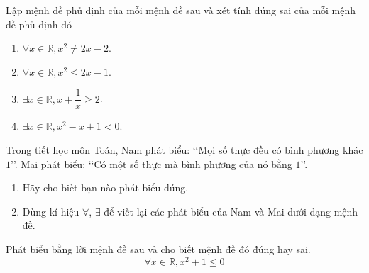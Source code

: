 \begin{bt}%
	Lập mệnh đề phủ định của mỗi mệnh đề sau và xét tính đúng sai của mỗi mệnh đề phủ định đó
	\begin{enumerate}
		\item $\forall x \in \mathbb{R}, x^2 \neq 2x-2$.
		\item $\forall x \in \mathbb{R}, x^2 \leq 2x-1$.
		\item $\exists x \in \mathbb{R}, x+\dfrac{1}{x} \geq 2$.
		\item $\exists x \in \mathbb{R}, x^2-x+1<0$.
	\end{enumerate}
\end{bt}
\begin{bt}%
	Trong tiết học môn Toán, Nam phát biểu: \lq\lq Mọi số thực đều có bình phương khác $1$\rq\rq. Mai phát biểu: \lq\lq Có một số thực mà bình phương của nó bằng $1$\rq\rq.
	\begin{enumerate}
		\item Hãy cho biết bạn nào phát biểu đúng.
		\item Dùng kí hiệu $\forall$, $\exists$ để viết lại các phát biểu của Nam và Mai dưới dạng mệnh đề.
	\end{enumerate}
\end{bt}
\begin{bt}%
	Phát biểu bằng lời mệnh đề sau và cho biết mệnh đề đó đúng hay sai.
	$$
	\forall x \in \mathbb{R}, x^2+1 \leq 0
	$$
\end{bt}

